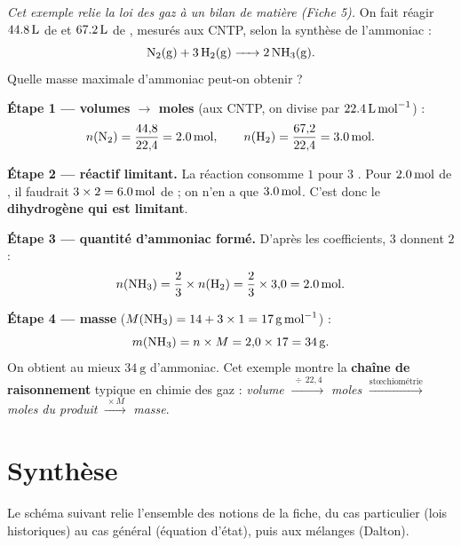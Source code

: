 \documentclass[11pt,a4paper]{article}
\begin{document}
\begin{exemple}
\emph{Cet exemple relie la loi des gaz à un bilan de matière (Fiche 5).} On fait réagir
$\qty{44{,}8}{\litre}$ de  et $\qty{67{,}2}{\litre}$ de , mesurés aux CNTP, selon la
synthèse de l'ammoniac :
\[ \ce{N2(g) + 3 H2(g) -> 2 NH3(g)}. \]
Quelle masse maximale d'ammoniac  peut-on obtenir ?

\smallskip
\textbf{Étape 1 — volumes $\to$ moles} (aux CNTP, on divise par $\qty{22{,}4}{\litre\per\mole}$) :
\[ n(\ce{N2})=\frac{44{,}8}{22{,}4}=\qty{2{,}0}{\mole},\qquad
   n(\ce{H2})=\frac{67{,}2}{22{,}4}=\qty{3{,}0}{\mole}. \]

\textbf{Étape 2 — réactif limitant.} La réaction consomme $1$  pour $3$ . Pour
$\qty{2{,}0}{\mole}$ de , il faudrait $3\times2=\qty{6{,}0}{\mole}$ de  ; on n'en a que
$\qty{3{,}0}{\mole}$. C'est donc le \textbf{dihydrogène  qui est limitant}.

\textbf{Étape 3 — quantité d'ammoniac formé.} D'après les coefficients, $3$  donnent $2$  :
\[ n(\ce{NH3})=\frac{2}{3}\times n(\ce{H2})=\frac{2}{3}\times3{,}0=\qty{2{,}0}{\mole}. \]

\textbf{Étape 4 — masse} ($M(\ce{NH3})=14+3\times1=\qty{17}{\gram\per\mole}$) :
\[ m(\ce{NH3})=n\times M=2{,}0\times17=\qty{34}{\gram}. \]
On obtient au mieux $\qty{34}{\gram}$ d'ammoniac. Cet exemple montre la \textbf{chaîne de raisonnement}
typique en chimie des gaz : \emph{volume} $\xrightarrow{\,\div\,22{,}4\,}$ \emph{moles}
$\xrightarrow{\text{stœchiométrie}}$ \emph{moles du produit} $\xrightarrow{\,\times M\,}$ \emph{masse}.
\end{exemple}

\section{Synthèse}

\noindent Le schéma suivant relie l'ensemble des notions de la fiche, du cas particulier (lois
historiques) au cas général (équation d'état), puis aux mélanges (Dalton).
\end{document}
